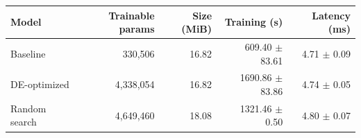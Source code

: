 \begin{tabular}{lrrrr}
\toprule
Model & Trainable params & Size (MiB) & Training (s) & Latency (ms) \\
\midrule
Baseline & 330,506 & 16.82 & \shortstack{609.40\\$\pm$ 83.61} & \shortstack{4.71\\$\pm$ 0.09} \\
DE-optimized & 4,338,054 & 16.82 & \shortstack{1690.86\\$\pm$ 83.86} & \shortstack{4.74\\$\pm$ 0.05} \\
Random search & 4,649,460 & 18.08 & \shortstack{1321.46\\$\pm$ 0.50} & \shortstack{4.80\\$\pm$ 0.07} \\
\bottomrule
\end{tabular}
